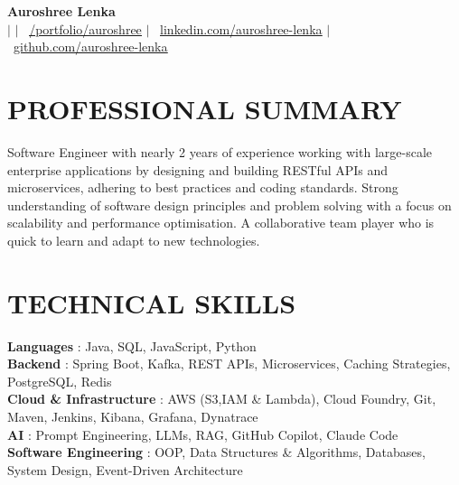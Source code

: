 \documentclass[a4paper,11pt]{article}
\begin{document}
\begin{center}
    \textbf{\Huge Auroshree Lenka} \\ \vspace{5pt}
    {\setlength{\baselineskip}{16pt}
    \small {} \hspace{1pt} $|$
    \hspace{1pt} \faEnvelope \hspace{2pt}{aurolenka2001@gmail.com} \hspace{1pt} $|$ 
    \hspace{1pt} \faGlobe~\href{https://auroshree-lenka.vercel.app}{\underline{/portfolio/auroshree}} \hspace{1pt} $|$
    \hspace{1pt} \faLinkedin~\href{https://linkedin.com/in/auroshree-lenka}{\underline{linkedin.com/auroshree-lenka}} $|$
    \hspace{1pt} \faGithub~\href{https://github.com/Alexwolf21}{\underline{github.com/auroshree-lenka}}
    }
    \\ \vspace{-3pt}
\end{center}

\section{PROFESSIONAL SUMMARY}
 Software Engineer with nearly 2 years of experience working with large-scale enterprise applications by designing and building RESTful APIs and microservices, adhering to best practices and coding standards. Strong understanding of software design principles and problem solving with a focus on scalability and performance optimisation. A collaborative team player who is quick to learn and adapt to new technologies.

\section{TECHNICAL SKILLS}
 \begin{itemize}[leftmargin=0in, label={}]
    \small{\item{
     \textbf{Languages} {: Java, SQL, JavaScript, Python}\vspace{2pt} \\
     \textbf{Backend} {: Spring Boot, Kafka, REST APIs, Microservices, Caching Strategies, PostgreSQL, Redis} \vspace{2pt} \\
     \textbf{Cloud \& Infrastructure} {: AWS (S3,IAM \& Lambda), Cloud Foundry, Git, Maven, Jenkins, Kibana, Grafana, Dynatrace} \vspace{2pt} \\
     \textbf{AI} {: Prompt Engineering, LLMs, RAG, GitHub Copilot, Claude Code} \vspace{2pt} \\
     \textbf{Software Engineering} {: OOP, Data Structures \& Algorithms, Databases, System Design, Event-Driven Architecture} 
    }}
 \end{itemize}
\end{document}
